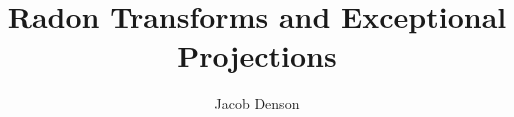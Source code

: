 \documentclass{article}
\title{Radon Transforms and Exceptional Projections}
\author{Jacob Denson}
\theoremstyle{plain}
\newtheorem{theorem}{Theorem}
\theoremstyle{remark}
\theoremstyle{definition}
\begin{document}
\begin{comment}

I propose to write a term report comparing and contrasting two methods to prove a theorem related to the theory of projections and Hausdorff dimension. The following is a brief discussion of the problem I wish to discuss, which we will take from Oberlin's paper ``Restricted Radon Transforms and Projections of Planar Sets''. If $L$ is an arbitrary line in Euclidean space, and $A$ is a Euclidean set, let $P_L(A)$ denote the projection of $A$ onto the line $L$. Recall Marstrand's projection theorem.

\begin{theorem}
	If $A$ is a Borel Euclidean set, then
	\begin{itemize}
		\item If $\dim A \leq 1$, then for a.e. $L$, $\dim P_L(A) = \dim A$ has dimension $d$.
		\item If $\dim A > 1$, then for a.e. $L$, $P_L(A)$ has positive Lebesgue measure.
		\item If $\dim A > 2$, then for a.e. $L$, $P_L(A)$ has nonempty interior.
	\end{itemize}
	so thick sets are likely to project down to thick sets.
\end{theorem}

One theme we explored in the class is that Hausdorff dimension provides a `higher order' estimate on the size of certain sets of the plane, providing more information than just the fact that a set has zero measure. It is therefore natural to extend Marstrand's projection theorem by asking how large the dimension of the set of `exceptional lines' is for which the properties of Marstrand's projection theorem fails to hold. For instance, we could ask the dimension of the set of lines $L$ for which $\dim P_L(A) < \dim A$, or the dimension of the set of lines for which $\dim P_L(A)$ has zero Lebesgue measure. Marstrand's results generalize, with some technical details, to show that the Hausdorff dimension of these sets decreases linearly with respect to the Hausdorff dimension. But Bourgain and Oberlin, in two separate papers, explored a much more powerful result in the plane.

\begin{theorem}
	If $A$ is a Borel subset of the plane, then
	\[ \dim \{ e \in S^1 : \dim P_e(A) \leq \dim A/2 \} = 0 \]
\end{theorem}

Oberlin's proof is more modern, avoiding the deep discretized results in arithmetic combinatoric required for Bourgain's proof, relying on results about the interpolation theory of functions in Besov spaces. I'll elaborate on the terse proof that Oberlin gives in his paper, as well as discussing the basic results on the interpolation theory of Besov spaces required in the proof, using Giovanni Leoni's book "A First Course in Sobolev Spaces".


\end{comment}
\end{document}

